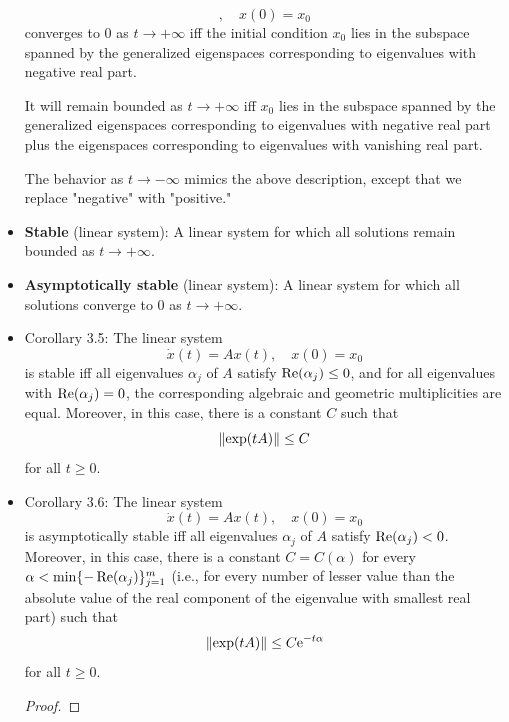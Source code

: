 \documentclass[../notes.tex]{subfiles}
\begin{document}
\begin{itemize}
\begin{equation*}
        ,\quad
        x(0) = x_0
    \end{equation*}
    converges to 0 as $t\to +\infty$ iff the initial condition $x_0$ lies in the subspace spanned by the generalized eigenspaces corresponding to eigenvalues with negative real part.\par
    It will remain bounded as $t\to +\infty$ iff $x_0$ lies in the subspace spanned by the generalized eigenspaces corresponding to eigenvalues with negative real part plus the eigenspaces corresponding to eigenvalues with vanishing real part.\par
    The behavior as $t\to -\infty$ mimics the above description, except that we replace "negative" with "positive."
    \item \textbf{Stable} (linear system): A linear system for which all solutions remain bounded as $t\to +\infty$.
    \item \textbf{Asymptotically stable} (linear system): A linear system for which all solutions converge to 0 as $t\to +\infty$.
    \item Corollary 3.5: The linear system
    \begin{equation*}
        \dot{x}(t) = Ax(t)
        ,\quad
        x(0) = x_0
    \end{equation*}
    is stable iff all eigenvalues $\alpha_j$ of $A$ satisfy $\Ree(\alpha_j)\leq 0$, and for all eigenvalues with $\Ree(\alpha_j)=0$, the corresponding algebraic and geometric multiplicities are equal. Moreover, in this case, there is a constant $C$ such that
    \begin{equation*}
        \norm{\exp(tA)} \leq C
    \end{equation*}
    for all $t\geq 0$.
    \item Corollary 3.6: The linear system
    \begin{equation*}
        \dot{x}(t) = Ax(t)
        ,\quad
        x(0) = x_0
    \end{equation*}
    is asymptotically stable iff all eigenvalues $\alpha_j$ of $A$ satisfy $\Ree(\alpha_j)<0$. Moreover, in this case, there is a constant $C=C(\alpha)$ for every $\alpha<\min\{-\Ree(\alpha_j)\}_{j=1}^m$ (i.e., for every number of lesser value than the absolute value of the real component of the eigenvalue with smallest real part) such that
    \begin{equation*}
        \norm{\exp(tA)} \leq C\e[-t\alpha]
    \end{equation*}
    for all $t\geq 0$.
    \begin{proof}

\end{proof}
\end{itemize}
\end{document}
